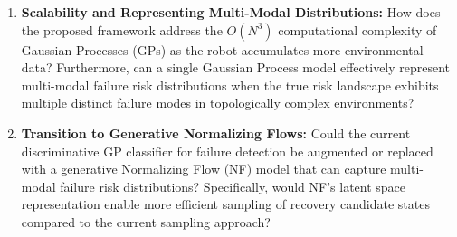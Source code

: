 \documentclass{article}
\begin{document}
\begin{enumerate}
    \item \textbf{Scalability and Representing Multi-Modal Distributions:} 
    How does the proposed framework address the $O(N^3)$ computational complexity of Gaussian Processes (GPs) as the robot accumulates more environmental data? Furthermore, can a single Gaussian Process model effectively represent multi-modal failure risk distributions when the true risk landscape exhibits multiple distinct failure modes in topologically complex environments?
    \item \textbf{Transition to Generative Normalizing Flows:} 
    Could the current discriminative GP classifier for failure detection be augmented or replaced with a generative Normalizing Flow (NF) model that can capture multi-modal failure risk distributions? Specifically, would NF's latent space representation enable more efficient sampling of recovery candidate states compared to the current sampling approach?
\end{enumerate}



\end{document}
